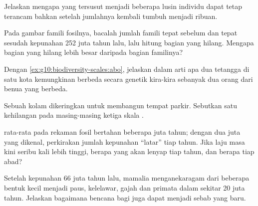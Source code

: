 \begin{exercise}[$\star\star$]\label{exo:g10:biodiversity-scales:8}
Jelaskan mengapa  yang tersusut menjadi beberapa lusin individu
dapat tetap terancam bahkan setelah jumlahnya kembali tumbuh menjadi ribuan.
\end{exercise}

\begin{exercise}[$\star\star$]\label{exo:g10:biodiversity-scales:9}
Pada gambar famili fosilnya, bacalah jumlah famili tepat sebelum dan
tepat sesudah kepunahan 252 juta tahun lalu, lalu hitung bagian yang
hilang. Mengapa bagian \emph{} yang hilang lebih besar daripada
bagian familinya?
\end{exercise}

\begin{exercise}[$\star\star$]\label{exo:g10:biodiversity-scales:10}
Dengan \cref{ex:g10:biodiversity-scales:abo}, jelaskan dalam arti apa
dua tetangga di satu kota kemungkinan berbeda secara genetik kira-kira
sebanyak dua orang dari benua yang berbeda.
\end{exercise}

\begin{exercise}[$\star\star$]\label{exo:g10:biodiversity-scales:11}
Sebuah kolam dikeringkan untuk membangun tempat parkir. Sebutkan satu
kehilangan pada masing-masing ketiga skala .
\end{exercise}

\begin{exercise}[$\star\star\star$]\label{exo:g10:biodiversity-scales:12}
 rata-rata pada rekaman fosil bertahan beberapa juta tahun;
dengan dua juta  yang dikenal, perkirakan jumlah kepunahan
``latar'' tiap tahun. Jika laju masa kini seribu kali lebih tinggi,
berapa  yang akan lenyap tiap tahun, dan berapa tiap abad?
\end{exercise}

\begin{exercise}[$\star\star\star$]\label{exo:g10:biodiversity-scales:13}
Setelah kepunahan 66 juta tahun lalu, mamalia menganekaragam dari
beberapa bentuk kecil menjadi paus, kelelawar, gajah dan primata dalam
sekitar 20 juta tahun. Jelaskan bagaimana bencana bagi  juga dapat menjadi sebab  yang baru.
\end{exercise}

